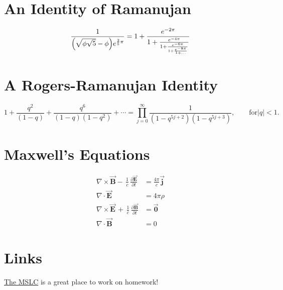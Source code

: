 \documentclass{article}
\begin{document}
\section{An Identity of Ramanujan}
\[ \frac{1}{\Bigl(\sqrt{\phi \sqrt{5}}-\phi\Bigr) e^{\frac25 \pi}} =
1+\frac{e^{-2\pi}} {1+\frac{e^{-4\pi}} {1+\frac{e^{-6\pi}}
{1+\frac{e^{-8\pi}} {1+\ldots} } } } \]

\section{A Rogers-Ramanujan Identity}
\[  1 +  \frac{q^2}{(1-q)}+\frac{q^6}{(1-q)(1-q^2)}+\cdots =
\prod_{j=0}^{\infty}\frac{1}{(1-q^{5j+2})(1-q^{5j+3})},
\quad\quad \text{for} |q|<1. \]

\section{Maxwell's Equations}
\[  \begin{aligned}
\nabla \times \vec{\mathbf{B}} -\, \frac1c\, \frac{\partial\vec{\mathbf{E}}}{\partial t} & = \frac{4\pi}{c}\vec{\mathbf{j}} \\
\nabla \cdot \vec{\mathbf{E}} & = 4 \pi \rho \\
\nabla \times \vec{\mathbf{E}}\, +\, \frac1c\, \frac{\partial\vec{\mathbf{B}}}{\partial t} & = \vec{\mathbf{0}} \\
\nabla \cdot \vec{\mathbf{B}} & = 0 
\end{aligned}\]

\section{Links}
\href{http://mslc.osu.edu}{
The MSLC} is a great place to work on homework!
\end{document}
